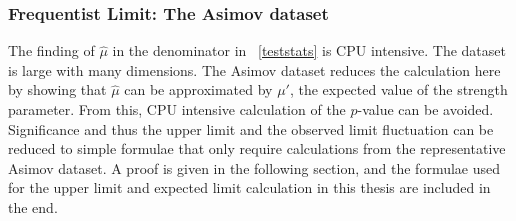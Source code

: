 %
%
%
%





\subsubsection{Frequentist Limit: The Asimov dataset}
\label{sec:asimov}

The finding of $\hat{\mu}$ in the denominator in ~\ref{teststats} is CPU intensive. The dataset is large with many dimensions. The Asimov dataset reduces the calculation here by showing that $\hat{\mu}$ can be approximated by $\mu'$, the expected value of the strength parameter. From this, CPU intensive calculation of the $p$-value can be avoided. Significance and thus the upper limit and the observed limit fluctuation can be reduced to simple formulae that only
require calculations from the representative Asimov dataset. 
A proof is given in the following section, and the formulae used for the upper limit and expected limit calculation in this thesis are included in the end. 

